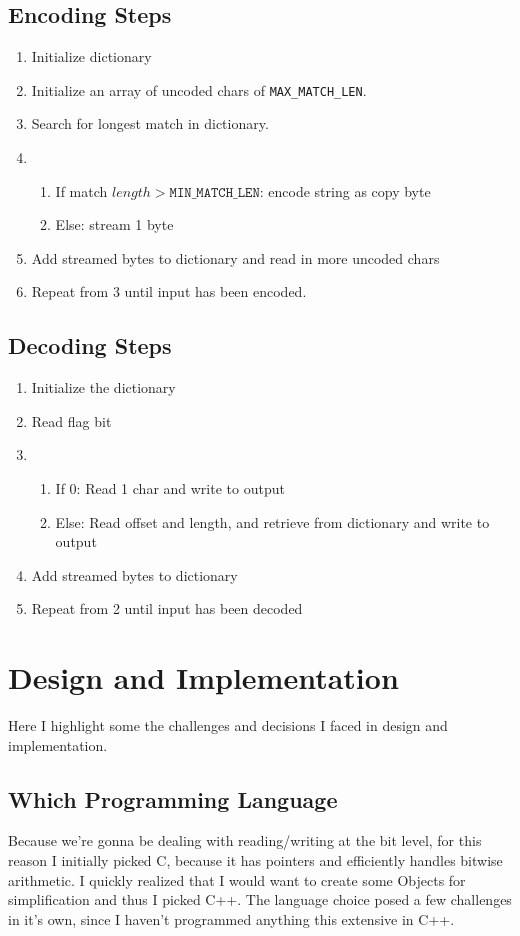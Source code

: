 \documentclass[a4paper]{article}
\begin{document}
\subsection{Encoding Steps}
\begin{enumerate}
\item Initialize dictionary
\item Initialize an array of uncoded chars of \texttt{MAX\_MATCH\_LEN}.
\item Search for longest match in dictionary.
\item 
   \begin{enumerate}
    \item If match \(length > \texttt{MIN\_MATCH\_LEN}\): encode string as copy byte
    \item Else: stream 1 byte
   \end{enumerate}
\item Add streamed bytes to dictionary and read in more uncoded chars
\item Repeat from 3 until input has been encoded.
\end{enumerate}
\subsection{Decoding Steps}
\begin{enumerate}
\item Initialize the dictionary
\item Read flag bit
\item 
   \begin{enumerate}
   \item If 0: Read 1 char and write to output
   \item Else: Read offset and length, and retrieve from dictionary and write to output
   \end{enumerate}
\item Add streamed bytes to dictionary 
\item Repeat from 2 until input has been decoded
\end{enumerate}


\section{Design and Implementation}
Here I highlight some the challenges and decisions I faced in design and implementation.
\subsection{Which Programming Language}
Because we're gonna be dealing with reading/writing at the bit level, for this reason I initially picked C, because it has pointers and efficiently handles bitwise arithmetic. I quickly realized that I would want to create some Objects for simplification and thus I picked C++. The language choice posed a few challenges in it's own, since I haven't programmed anything this extensive in C++.
\end{document}
